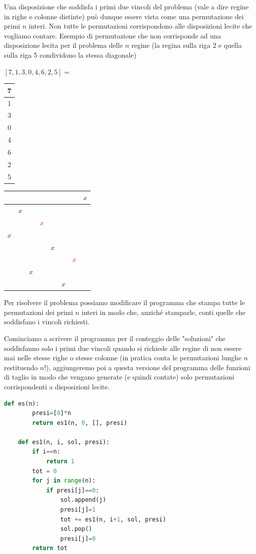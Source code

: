 Una disposizione che soddisfa i primi due vincoli del problema (vale a dire regine in righe e colonne distinte) può dunque essere vista come una permutazione dei primi $n$ interi. Non tutte le permutazioni corrispondono alle disposizioni lecite che vogliamo contare. Esempio di permutazione che non corrisponde ad una disposizione lecita per il problema delle $n$ regine (la regina sulla riga 2 e quella sulla riga 5 condividono la stessa diagonale)
\begin{center}$[7, 1, 3, 0, 4, 6, 2, 5]=$ 
\begin{tabular}{|c|}
    \hline
     7\\\hline
     1\\\hline
     3\\\hline
     0\\\hline
     4\\\hline
     6\\\hline
     2\\\hline
     5\\\hline
\end{tabular}
\begin{tabular}{|c|c|c|c|c|c|c|c|}
    \hline
     &&&&&&&$x$\\\hline
     &$x$&&&&&&\\\hline
     &&&\textcolor{red}{$x$}&&&&\\\hline
     $x$&&&&&&&\\\hline
     &&&&$x$&&&\\\hline
     &&&&&&\textcolor{red}{$x$}&\\\hline
     &&$x$&&&&&\\\hline
     &&&&&$x$&&\\\hline
\end{tabular}\hspace{0.5cm}
\end{center}

Per risolvere il problema possiamo modificare il programma che stampa tutte le permutazioni dei primi $n$ interi in modo che, anziché stamparle, conti quelle che soddisfano i vincoli richiesti.

Cominciamo a scrivere il programma per il conteggio delle "soluzioni" che soddisfanno solo i primi due vincoli quando si richiede alle regine di non essere mai nelle stesse righe o stesse colonne (in pratica conta le permutazioni lunghe $n$ restituendo $n!$), aggiungeremo poi a questa versione del programma delle funzioni di taglio in modo che vengano generate (e quindi contate) solo permutazioni corrispondenti a disposizioni lecite.
\begin{lstlisting}[language=Python]
    def es(n):
        presi=[0]*n
        return es1(n, 0, [], presi)

    def es1(n, i, sol, presi): 
        if i==n:
            return 1
        tot = 0
        for j in range(n): 
            if presi[j]==0:
                sol.append(j)
                presi[j]=1
                tot += es1(n, i+1, sol, presi)
                sol.pop()
                presi[j]=0
        return tot
\end{lstlisting}


